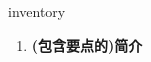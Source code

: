 
\begin{frame}
{\huge inventory}
\begin{center}
\begin{enumerate}\Large
  \item \textbf{(包含要点的)简介}
\end{enumerate}
\end{center}
\end{frame}
